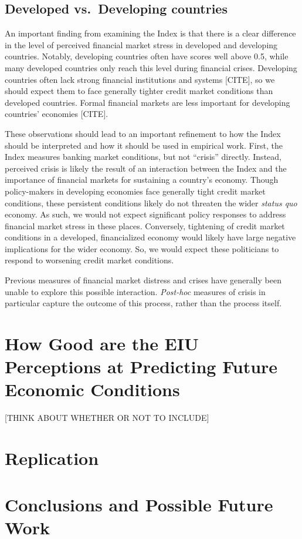 \documentclass[]{article}
\begin{document}
\subsection{Developed vs.~Developing
countries}\label{developed-vs.developing-countries}

An important finding from examining the Index is that there is a clear
difference in the level of perceived financial market stress in
developed and developing countries. Notably, developing countries often
have scores well above 0.5, while many developed countries only reach
this level during financial crises. Developing countries often lack
strong financial institutions and systems {[}CITE{]}, so we should
expect them to face generally tighter credit market conditions than
developed countries. Formal financial markets are less important for
developing countries' economies {[}CITE{]}.

These observations should lead to an important refinement to how the
Index should be interpreted and how it should be used in empirical work.
First, the Index measures banking market conditions, but not ``crisis''
directly. Instead, perceived crisis is likely the result of an
interaction between the Index and the importance of financial markets
for sustaining a country's economy. Though policy-makers in developing
economies face generally tight credit market conditions, these
persistent conditions likely do not threaten the wider \emph{status quo}
economy. As such, we would not expect significant policy responses to
address financial market stress in these places. Conversely, tightening
of credit market conditions in a developed, financialized economy would
likely have large negative implications for the wider economy. So, we
would expect these politicians to respond to worsening credit market
conditions.

Previous measures of financial market distress and crises have generally
been unable to explore this possible interaction. \emph{Post-hoc}
measures of crisis in particular capture the outcome of this process,
rather than the process itself.

\section{How Good are the EIU Perceptions at Predicting Future Economic
Conditions}

{[}THINK ABOUT WHETHER OR NOT TO INCLUDE{]}

\section{Replication}\label{replication}

\section{Conclusions and Possible Future
Work}\label{conclusions-and-possible-future-work}




\end{document}
